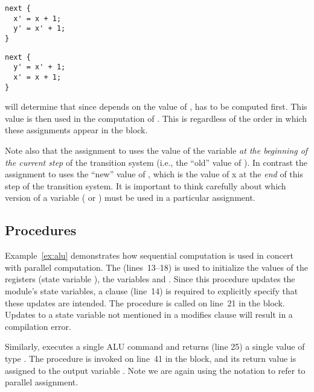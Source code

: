 \begin{lstlisting}[language=uclid,style=uclidstyle]
next {
  x' = x + 1;
  y' = x' + 1;
}
\end{lstlisting}

\begin{lstlisting}[language=uclid,style=uclidstyle]
next {
  y' = x' + 1;
  x' = x + 1;
}
\end{lstlisting}

    \uclid{} will determine that since  depends on the value of ,  has to be computed first. This value is then used in the computation of . This is regardless of the order in which these assignments appear in the  block.

    Note also that the assignment to  uses the value of the variable  \emph{at the beginning of the current step} of the transition system (i.e., the ``old'' value of ). In contrast the assignment to  uses the ``new'' value of , which is the value of x at the \emph{end} of this step of the transition system. It is important to think carefully about which version of a variable ( or ) must be used in a particular assignment.

\subsection{Procedures}
Example~\ref{ex:alu} demonstrates how sequential computation is used in concert with parallel computation. The   (lines~13--18) is used to initialize the values of the registers (state variable ), the variables  and . Since this procedure updates the module's state variables, a  clause (line~14) is required to explicitly specify that these updates are intended. The procedure is called on line~21 in the  block. Updates to a state variable not mentioned in a modifies clause will result in a compilation error.

Similarly,   executes a single ALU command and returns (line 25) a single value of type . The procedure is invoked on line~41 in the  block, and its return value is assigned to the output variable . Note we are again using the notation  to refer to parallel assignment.

